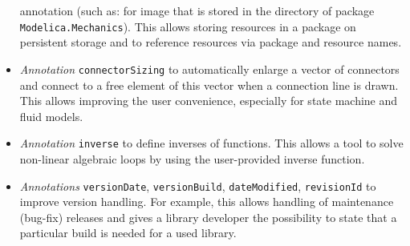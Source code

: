 \begin{itemize}
  annotation (such as:  for image
   that is stored in the directory of package
  \lstinline!Modelica.Mechanics!). This allows storing resources in a package on
  persistent storage and to reference resources via package and resource
  names.
\item
  \emph{Annotation} \lstinline!connectorSizing! to automatically enlarge a
  vector of connectors and connect to a free element of this vector when
  a connection line is drawn. This allows improving the user
  convenience, especially for state machine and fluid models.
\item
  \emph{Annotation} \lstinline!inverse! to define inverses of functions. This
  allows a tool to solve non-linear algebraic loops by using the
  user-provided inverse function.
\item
  \emph{Annotations} \lstinline!versionDate!, \lstinline!versionBuild!,
  \lstinline!dateModified!, \lstinline!revisionId! to improve version handling. For
  example, this allows handling of maintenance (bug-fix) releases and
  gives a library developer the possibility to state that a particular
  build is needed for a used library.
\end{itemize}

